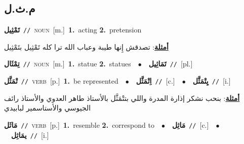 \documentclass[10pt,a4paper,twoside]{article} %
\begin{document}
\begin{multicols}{2}
\vspace{-3mm}
\subsection*{\color{blue}\foreignlanguage{arabic}{م.ث.ل}\color{blue}{}} 

{\setlength\topsep{0pt}\textbf{\foreignlanguage{arabic}{تَمْثِيل}}\ {\color{gray}\texttt{//}\color{black}}\ \textsc{noun}\ [m.]\ \textbf{1.}~acting  \textbf{2.}~pretension\  \begin{flushright}\color{gray}\foreignlanguage{arabic}{\textbf{\underline{\foreignlanguage{arabic}{أمثلة}}}: تصدقش إِنها طيبة وعباب الله ترا كله تَمْثِيل بتَمْثِيل}\end{flushright}\color{black}} \vspace{2mm}

{\setlength\topsep{0pt}\textbf{\foreignlanguage{arabic}{تِمْثَال}}\ {\color{gray}\texttt{//}\color{black}}\ \textsc{noun}\ [m.]\ \textbf{1.}~statue  \textbf{2.}~statues\ \ $\bullet$\ \ \setlength\topsep{0pt}\textbf{\foreignlanguage{arabic}{تَمَاثِيل}}\ {\color{gray}\texttt{//}\color{black}}\ [pl.]\ } \vspace{2mm}

{\setlength\topsep{0pt}\textbf{\foreignlanguage{arabic}{تْمَثَّل}}\ {\color{gray}\texttt{//}\color{black}}\ \textsc{verb}\ [p.]\ \textbf{1.}~be represented\ \ $\bullet$\ \ \setlength\topsep{0pt}\textbf{\foreignlanguage{arabic}{اِتْمَثَّل}}\ {\color{gray}\texttt{//}\color{black}}\ [c.]\ \ $\bullet$\ \ \setlength\topsep{0pt}\textbf{\foreignlanguage{arabic}{يِتْمَثَّل}}\ {\color{gray}\texttt{//}\color{black}}\ [i.]\  \begin{flushright}\color{gray}\foreignlanguage{arabic}{\textbf{\underline{\foreignlanguage{arabic}{أمثلة}}}: بنحب نشكر إذارة المدرة واللي بتتْمَثَّل بالأستاذ طاهر العدوي والأستاذ رائف الجيوسي والأستاسمير لبابيدي}\end{flushright}\color{black}} \vspace{2mm}

{\setlength\topsep{0pt}\textbf{\foreignlanguage{arabic}{مَاثَل}}\ {\color{gray}\texttt{//}\color{black}}\ \textsc{verb}\ [p.]\ \textbf{1.}~resemble  \textbf{2.}~correspond to\ \ $\bullet$\ \ \setlength\topsep{0pt}\textbf{\foreignlanguage{arabic}{مَاثِل}}\ {\color{gray}\texttt{//}\color{black}}\ [c.]\ \ $\bullet$\ \ \setlength\topsep{0pt}\textbf{\foreignlanguage{arabic}{يمَاثِل}}\ {\color{gray}\texttt{//}\color{black}}\ [i.]\ } \vspace{2mm}


\end{multicols}
\end{document}
